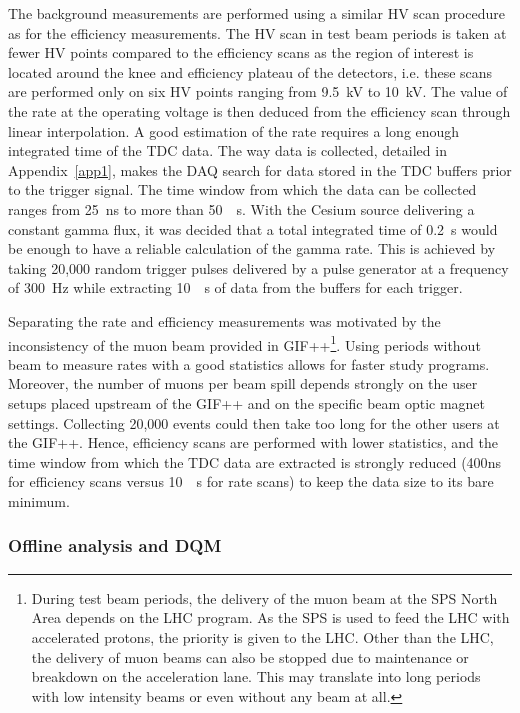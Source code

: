 	The background measurements are performed using a similar HV scan procedure as for the efficiency measurements. The HV scan in test beam periods is taken at fewer HV points compared to the efficiency scans as the region of interest is located around the knee and efficiency plateau of the detectors, i.e. these scans are performed only on six HV points ranging from \SI{9.5}{kV} to \SI{10}{kV}. The value of the rate at the operating voltage is then deduced from the efficiency scan through linear interpolation. A good estimation of the rate requires a long enough integrated time of the TDC data. The way data is collected, detailed in Appendix~\ref{app1}, makes the DAQ search for data stored in the TDC buffers prior to the trigger signal. The time window from which the data can be collected ranges from \SI{25}{ns} to more than \SI{50}{\mu s}. With the Cesium source delivering a constant gamma flux, it was decided that a total integrated time of \SI{0.2}{s} would be enough to have a reliable calculation of the gamma rate. This is achieved by taking 20,000 random trigger pulses delivered by a pulse generator at a frequency of \SI{300}{Hz} while extracting \SI{10}{\mu s} of data from the buffers for each trigger.
		
	Separating the rate and efficiency measurements was motivated by the inconsistency of the muon beam provided in GIF++\footnote{During test beam periods, the delivery of the muon beam at the SPS North Area depends on the LHC program. As the SPS is used to feed the LHC with accelerated protons, the priority is given to the LHC. Other than the LHC, the delivery of muon beams can also be stopped due to maintenance or breakdown on the acceleration lane. This may translate into long periods with low intensity beams or even without any beam at all.}. Using periods without beam to measure rates with a good statistics allows for faster study programs. Moreover, the number of muons per beam spill depends strongly on the user setups placed upstream of the GIF++ and on the specific beam  optic magnet settings. Collecting 20,000 events could then take too long for the other users at the GIF++. Hence, efficiency scans are performed with lower statistics, and the time window from which the TDC data are extracted is strongly reduced (\si{400}{ns} for efficiency scans versus \SI{10}{\mu s} for rate scans) to keep the data size to its bare minimum.
	
		\subsubsection{Offline analysis and \acl{DQM}}
		\label{chapt5:sssec:DQM}
		
